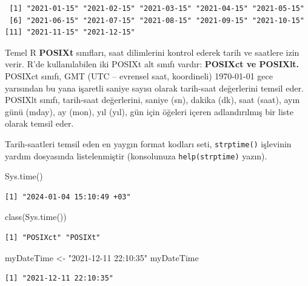 \documentclass[
  letterpaper,
  DIV=11,
  numbers=noendperiod]{scrreprt}
\newenvironment{Shaded}{\begin{snugshade}}{\end{snugshade}}
\newcommand{\FunctionTok}[1]{\textcolor[rgb]{0.28,0.35,0.67}{#1}}
\newcommand{\NormalTok}[1]{\textcolor[rgb]{0.00,0.23,0.31}{#1}}
\newcommand{\OtherTok}[1]{\textcolor[rgb]{0.00,0.23,0.31}{#1}}
\newcommand{\StringTok}[1]{\textcolor[rgb]{0.13,0.47,0.30}{#1}}
\begin{document}
\begin{verbatim}
 [1] "2021-01-15" "2021-02-15" "2021-03-15" "2021-04-15" "2021-05-15"
 [6] "2021-06-15" "2021-07-15" "2021-08-15" "2021-09-15" "2021-10-15"
[11] "2021-11-15" "2021-12-15"
\end{verbatim}

Temel R \textbf{POSIXt} sınıfları, saat dilimlerini kontrol ederek tarih
ve saatlere izin verir. R'de kullanılabilen iki POSIXt alt sınıfı
vardır: \textbf{POSIXct ve POSIXlt.} POSIXct sınıfı, GMT (UTC --
evrensel saat, koordineli) 1970-01-01 gece yarısından bu yana işaretli
saniye sayısı olarak tarih-saat değerlerini temsil eder. POSIXlt sınıfı,
tarih-saat değerlerini, saniye (sn), dakika (dk), saat (saat), ayın günü
(mday), ay (mon), yıl (yıl), gün için öğeleri içeren adlandırılmış bir
liste olarak temsil eder.

Tarih-saatleri temsil eden en yaygın format kodları seti,
\texttt{strptime()} işlevinin yardım dosyasında listelenmiştir
(konsolunuza \texttt{help(strptime)} yazın).

\begin{Shaded}
\begin{Highlighting}[]
\FunctionTok{Sys.time}\NormalTok{()}
\end{Highlighting}
\end{Shaded}

\begin{verbatim}
[1] "2024-01-04 15:10:49 +03"
\end{verbatim}

\begin{Shaded}
\begin{Highlighting}[]
\FunctionTok{class}\NormalTok{(}\FunctionTok{Sys.time}\NormalTok{())}
\end{Highlighting}
\end{Shaded}

\begin{verbatim}
[1] "POSIXct" "POSIXt" 
\end{verbatim}

\begin{Shaded}
\begin{Highlighting}[]
\NormalTok{myDateTime }\OtherTok{\textless{}{-}} \StringTok{"2021{-}12{-}11 22:10:35"}
\NormalTok{myDateTime}
\end{Highlighting}
\end{Shaded}

\begin{verbatim}
[1] "2021-12-11 22:10:35"
\end{verbatim}
\end{document}
